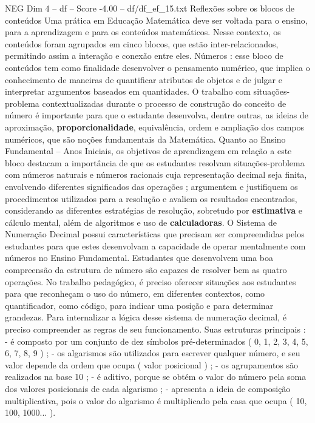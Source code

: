 \begin{textsample}{NEG Dim 4 – df – Score -4.00 – df/df\_ef\_15.txt}  \label{ex:f4_neg_061}
Reflexões sobre os blocos de conteúdos Uma prática em Educação Matemática deve ser voltada para o ensino, para a aprendizagem e para os conteúdos matemáticos.
Nesse contexto, os conteúdos foram agrupados em cinco blocos, que estão inter-relacionados, permitindo assim a interação e conexão entre eles.
Números : esse bloco de conteúdos tem como finalidade desenvolver o pensamento numérico, que implica o conhecimento de maneiras de quantificar atributos de objetos e de julgar e interpretar argumentos baseados em quantidades.
O trabalho com situações-problema contextualizadas durante o processo de construção do conceito de número é importante para que o estudante desenvolva, dentre outras, as ideias de aproximação, \textbf{proporcionalidade}, equivalência, ordem e ampliação dos campos numéricos, que são noções fundamentais da Matemática.
Quanto ao Ensino Fundamental – Anos Iniciais, os objetivos de aprendizagem em relação a este bloco destacam a importância de que os estudantes resolvam situações-problema com números naturais e números racionais cuja representação decimal seja finita, envolvendo diferentes significados das operações ; argumentem e justifiquem os procedimentos utilizados para a resolução e avaliem os resultados encontrados, considerando as diferentes estratégias de resolução, sobretudo por \textbf{estimativa} e cálculo mental, além de algoritmos e uso de \textbf{calculadoras}.
O Sistema de Numeração Decimal possui características que precisam ser compreendidas pelos estudantes para que estes desenvolvam a capacidade de operar mentalmente com números no Ensino Fundamental.
Estudantes que desenvolvem uma boa compreensão da estrutura de número são capazes de resolver bem as quatro operações.
No trabalho pedagógico, é preciso oferecer situações aos estudantes para que reconheçam o uso do número, em diferentes contextos, como quantificador, como código, para indicar uma posição e para determinar grandezas.
Para internalizar a lógica desse sistema de numeração decimal, é preciso compreender as regras de seu funcionamento.
Suas estruturas principais : - é composto por um conjunto de dez símbolos pré-determinados ( 0, 1, 2, 3, 4, 5, 6, 7, 8, 9 ) ; - os algarismos são utilizados para escrever qualquer número, e seu valor depende da ordem que ocupa ( valor posicional ) ; - os agrupamentos são realizados na base 10 ; - é aditivo, porque se obtém o valor do número pela soma dos valores posicionais de cada algarismo ; - apresenta a ideia de composição multiplicativa, pois o valor do algarismo é multiplicado pela casa que ocupa ( 10, 100, 1000... ).

\end{textsample}
